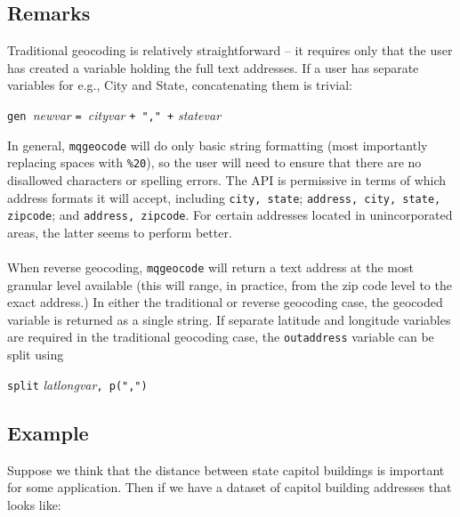 \documentclass[11pt]{article}
\begin{document}
\subsection{Remarks}
Traditional geocoding is relatively straightforward -- it requires only that the user has created a variable holding the full text addresses. If a user has separate variables for e.g., City and State, concatenating them is trivial:

 \begin{center}\verb|gen |\textit{newvar} \verb|= |\textit{cityvar} \verb|+ "," +| \textit{statevar} \end{center} 
In general, \verb|mqgeocode| will do only basic string formatting (most importantly replacing spaces with \verb|%20|), so the user will need to ensure that there are no disallowed characters or spelling errors. The API is permissive in terms of which address formats it will accept, including \verb|city, state|; \verb|address, city, state, zipcode|; and \verb|address, zipcode|. For certain addresses located in unincorporated areas, the latter seems to perform better. 
\\ \\
When reverse geocoding, \verb|mqgeocode| will return a text address at the most granular level available (this will range, in practice, from the zip code level to the exact address.) In either the traditional or reverse geocoding case, the geocoded variable is returned as a single string. If separate latitude and longitude variables are required in the traditional geocoding case, the \verb|outaddress| variable can be split using

\begin{center}
\verb|split| \textit{latlongvar}\verb|, p(",")|
\end{center}

\subsection{Example}
Suppose we think that the distance between state capitol buildings is important for some application. Then if we have a dataset of capitol building addresses that looks like:
\end{document}
